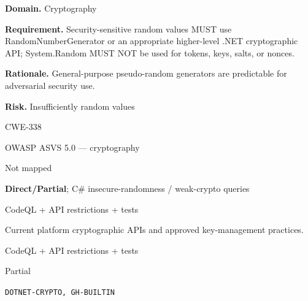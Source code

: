 \documentclass[10pt,letterpaper]{article}
\newcommand{\prioritybadge}[2]{\tcbox[on line,boxrule=0pt,arc=1.2mm,boxsep=0.7mm,left=1mm,right=1mm,top=0.4mm,bottom=0.4mm,colback=#2!12,coltext=#2]{\scriptsize\bfseries #1}}
\begin{document}
\begin{rulebox}[title={\texttt{SCS-CSHARP-CRYPTO-001} \hfill \prioritybadge{Critical Control}{Critical}}]
\textbf{Domain.} Cryptography

\textbf{Requirement.} Security-sensitive random values MUST use RandomNumberGenerator or an appropriate higher-level .NET cryptographic API; System.Random MUST NOT be used for tokens, keys, salts, or nonces.

\textbf{Rationale.} General-purpose pseudo-random generators are predictable for adversarial security use.

\textbf{Risk.} Insufficiently random values

\begin{description}[leftmargin=2.65cm,labelwidth=2.3cm,style=nextline,itemsep=1pt,topsep=3pt]
  \item[CWE] CWE-338
  \item[OWASP] OWASP ASVS 5.0 --- cryptography
  \item[CERT] Not mapped
  \item[CodeQL] \textbf{Direct/Partial}; C\# insecure-randomness / weak-crypto queries
  \item[Enforcement] CodeQL + API restrictions + tests
  \item[Prevention] Current platform cryptographic APIs and approved key-management practices.
  \item[Verification] CodeQL + API restrictions + tests
  \item[Automation] Partial
  \item[Sources] \texttt{DOTNET-CRYPTO, GH-BUILTIN}
\end{description}
\end{rulebox}
\end{document}
